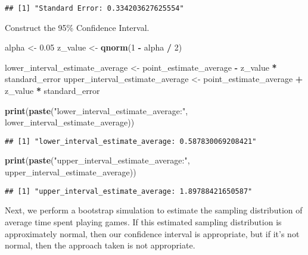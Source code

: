 \documentclass[
]{article}
\newenvironment{Shaded}{\begin{snugshade}}{\end{snugshade}}
\newcommand{\DecValTok}[1]{\textcolor[rgb]{0.00,0.00,0.81}{#1}}
\newcommand{\FloatTok}[1]{\textcolor[rgb]{0.00,0.00,0.81}{#1}}
\newcommand{\FunctionTok}[1]{\textcolor[rgb]{0.13,0.29,0.53}{\textbf{#1}}}
\newcommand{\NormalTok}[1]{#1}
\newcommand{\OtherTok}[1]{\textcolor[rgb]{0.56,0.35,0.01}{#1}}
\newcommand{\SpecialCharTok}[1]{\textcolor[rgb]{0.81,0.36,0.00}{\textbf{#1}}}
\newcommand{\StringTok}[1]{\textcolor[rgb]{0.31,0.60,0.02}{#1}}
\begin{document}
\begin{verbatim}
## [1] "Standard Error: 0.334203627625554"
\end{verbatim}

Construct the 95\% Confidence Interval.

\begin{Shaded}
\begin{Highlighting}[]
\NormalTok{alpha }\OtherTok{\textless{}{-}} \FloatTok{0.05}
\NormalTok{z\_value }\OtherTok{\textless{}{-}} \FunctionTok{qnorm}\NormalTok{(}\DecValTok{1} \SpecialCharTok{{-}}\NormalTok{ alpha }\SpecialCharTok{/} \DecValTok{2}\NormalTok{)}

\NormalTok{lower\_interval\_estimate\_average }\OtherTok{\textless{}{-}}\NormalTok{ point\_estimate\_average }\SpecialCharTok{{-}}\NormalTok{ z\_value }\SpecialCharTok{*}\NormalTok{ standard\_error}
\NormalTok{upper\_interval\_estimate\_average }\OtherTok{\textless{}{-}}\NormalTok{ point\_estimate\_average }\SpecialCharTok{+}\NormalTok{ z\_value }\SpecialCharTok{*}\NormalTok{ standard\_error}

\FunctionTok{print}\NormalTok{(}\FunctionTok{paste}\NormalTok{(}\StringTok{"lower\_interval\_estimate\_average:"}\NormalTok{, lower\_interval\_estimate\_average))}
\end{Highlighting}
\end{Shaded}

\begin{verbatim}
## [1] "lower_interval_estimate_average: 0.587830069208421"
\end{verbatim}

\begin{Shaded}
\begin{Highlighting}[]
\FunctionTok{print}\NormalTok{(}\FunctionTok{paste}\NormalTok{(}\StringTok{"upper\_interval\_estimate\_average:"}\NormalTok{, upper\_interval\_estimate\_average))}
\end{Highlighting}
\end{Shaded}

\begin{verbatim}
## [1] "upper_interval_estimate_average: 1.89788421650587"
\end{verbatim}

Next, we perform a bootstrap simulation to estimate the sampling
distribution of average time spent playing games. If this estimated
sampling distribution is approximately normal, then our confidence
interval is appropriate, but if it's not normal, then the approach taken
is not appropriate.
\end{document}
